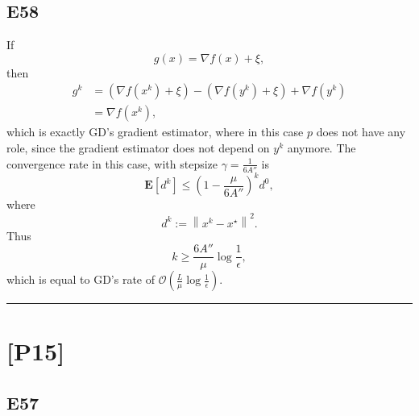 \documentclass[12pt]{article}
\begin{document}
\subsection*{E58}
If
\begin{equation*}
    g(x) = \nabla f(x) + \xi,
\end{equation*}
then
\begin{equation*}
    \begin{split}
        g^k &= (\nabla f(x^k) + \xi) - (\nabla f(y^k) + \xi) + \nabla f(y^k) \\
            &= \nabla f(x^k),
    \end{split}
\end{equation*}
which is exactly GD's gradient estimator, where in this case $p$ does not have any role, since the gradient estimator does not depend on $y^k$ anymore. 
The convergence rate in this case, with stepsize $\gamma = \frac{1}{6A''}$ is
\begin{equation*}
    \mathbf{E}[d^k] \leq \left(1 - \frac{\mu}{6A''}\right)^kd^0,
\end{equation*}
where
\begin{equation*}
    d^k := \left\| x^k - x^\star \right\|^2.
\end{equation*}
Thus
\begin{equation*}
    k \geq \frac{6A''}{\mu}\log\frac{1}{\epsilon},
\end{equation*}
which is equal to GD's rate of $\mathcal{O}\left(\frac{L}{\mu}\log\frac{1}{\epsilon}\right)$.

\hrule
\vspace{0.1cm}
\section*{[P15]}
\subsection*{E57}
\end{document}
